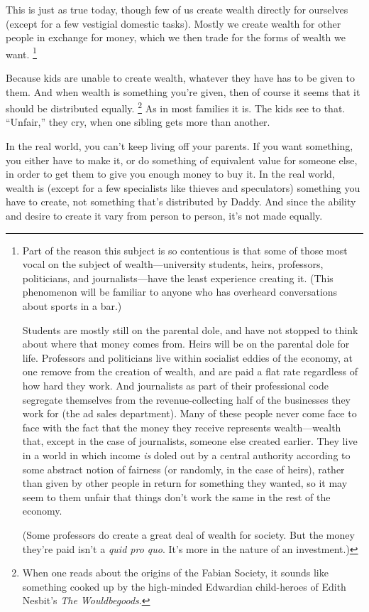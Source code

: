 \documentclass[12pt]{book}
\begin{document}
This is just as true today, though few of us create wealth directly for
ourselves (except for a few vestigial domestic tasks). Mostly we create
wealth for other people in exchange for money, which we then trade for
the forms of wealth we want. \footnote{Part of the reason this subject is so contentious is that some
of those most vocal on the subject of wealth---university students,
heirs, professors, politicians, and journalists---have the least
experience creating it. (This phenomenon will be familiar to anyone who
has overheard conversations about sports in a bar.)

Students are mostly still on the parental dole, and have not stopped to
think about where that money comes from. Heirs will be on the parental
dole for life. Professors and politicians live within socialist eddies
of the economy, at one remove from the creation of wealth, and are paid
a flat rate regardless of how hard they work. And journalists as part of
their professional code segregate themselves from the revenue-collecting
half of the businesses they work for (the ad sales department). Many of
these people never come face to face with the fact that the money they
receive represents wealth---wealth that, except in the case of
journalists, someone else created earlier. They live in a world in which
income \emph{is} doled out by a central authority according to some
abstract notion of fairness (or randomly, in the case of heirs), rather
than given by other people in return for something they wanted, so it
may seem to them unfair that things don't work the same in the rest of
the economy.

(Some professors do create a great deal of wealth for society. But the
money they're paid isn't a \emph{quid pro quo}. It's more in the nature
of an investment.)}

Because kids are unable to create wealth, whatever they have has to be
given to them. And when wealth is something you're given, then of course
it seems that it should be distributed equally. \footnote{When one reads about the origins of the Fabian Society, it
sounds like something cooked up by the high-minded Edwardian
child-heroes of Edith Nesbit's \emph{The Wouldbegoods}.}
As in most families it is. The kids see to that. ``Unfair,'' they cry,
when one sibling gets more than another.

In the real world, you can't keep living off your parents. If you want
something, you either have to make it, or do something of equivalent
value for someone else, in order to get them to give you enough money to
buy it. In the real world, wealth is (except for a few specialists like
thieves and speculators) something you have to create, not something
that's distributed by Daddy. And since the ability and desire to create
it vary from person to person, it's not made equally.
\end{document}
